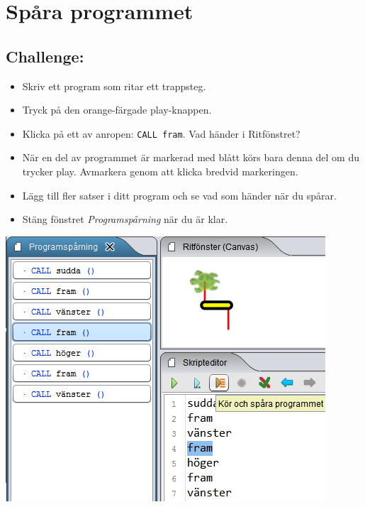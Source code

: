 \chapter{Spåra programmet}
\begin{multicols}{2}
\section*{\color{BrickRed}Challenge:}


\begin{itemize}

\item {Skriv ett program som ritar ett trappsteg.}
\item {Tryck på den orange-färgade play-knappen.}
\item {Klicka på ett av anropen: \lstinline{CALL fram}. Vad händer i Ritfönstret?}
\item {När en del av programmet är markerad med blått körs bara denna del om du trycker play. Avmarkera genom att klicka bredvid markeringen. }
\item {Lägg till fler satser i ditt program och se vad som händer när du spårar.}
\item {Stäng fönstret {\it Programspårning} när du är klar.}

\end{itemize}



\columnbreak

\begin{center}
\includegraphics{../img/trace.png}
\end{center}

\end{multicols}

